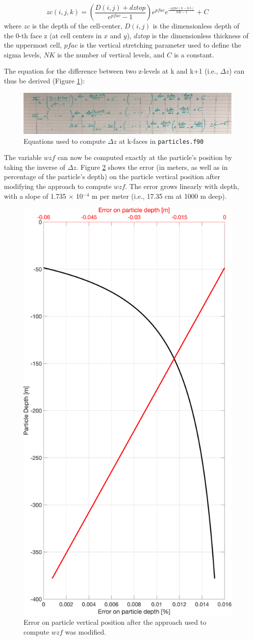 \documentclass[]{article}
\begin{document}
\begin{equation} \label{eq: zc}
zc(i,j,k) = \left(\frac{D(i,j)+dztop}{e^{pfac}-1}\right)e^{pfac}e^{\frac{-pfac(k-0.5)}{NK-1}} + C 
\end{equation}
where $zc$ is the depth of the cell-center, $D(i,j)$ is the dimensionless depth of the 0-th face z (at cell centers in $x$ and $y$), $dztop$ is the dimensionless thickness of the uppermost cell, $pfac$ is the vertical stretching parameter used to define the sigma levels, $NK$ is the number of vertical levels, and $C$ is a constant.

The equation for the difference between two z-levels at k and k+1 (i.e., $\Delta z$) can thus be derived (Figure \ref{fig: Dz_derivation}):

\begin{figure}[!h]
	\centering
	\includegraphics[width = \linewidth]{Dz_derivation.jpeg}
	\caption{\label{fig: Dz_derivation} Equations used to compute $\Delta z$ at k-faces in \texttt{particles.f90}}
\end{figure}

The variable $wzf$ can now be computed exactly at the particle's position by taking the inverse of $\Delta z$. Figure \ref{fig: no_model_error} shows the error (in meters, as well as in percentage of the particle's depth) on the particle vertical position after modifying the approach to compute $wzf$. The error grows linearly with depth, with a slope of 1.735 $\times$ 10$^{-4}$ m per meter (i.e., 17.35 cm at 1000 m deep).

\begin{figure}[!h]
	\centering
	\includegraphics[width = .35\linewidth]{error_corrected.png}
	\caption{\label{fig: no_model_error} Error on particle vertical position after the approach used to compute $wzf$ was modified.}
\end{figure}
\end{document}
